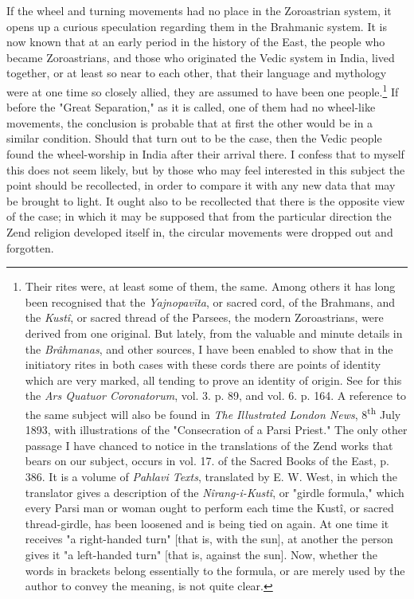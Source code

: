 \documentclass[a4paper, 11pt, oneside, polutonikogreek, english]{article}
\begin{document}
If the wheel and turning movements had no place in the Zoroastrian system, it opens up a curious speculation regarding them in the Brahmanic system. It is now known that at an early period in the history of the East, the people who became Zoroastrians, and those who originated the Vedic system in India, lived together, or at least so near to each other, that their language and mythology were at one time so closely allied, they are assumed to have been one people.\footnote{Their rites were, at least some of them, the same. Among others it has long been recognised that the \emph{Yajnopavīta}, or sacred cord, of the Brahmans, and the \emph{Kustî}, or sacred thread of the Parsees, the modern Zoroastrians, were derived from one original. But lately, from the valuable and minute details in the \emph{Brâhmanas}, and other sources, I have been enabled to show that in the initiatory rites in both cases with these cords there are points of identity which are very marked, all tending to prove an identity of origin. See for this the \emph{Ars Quatuor Coronatorum}, vol. 3. p. 89, and vol. 6. p. 164. A reference to the same subject will also be found in \emph{The Illustrated London News}, 8\textsuperscript{th} July 1893, with illustrations of the "Consecration of a Parsi Priest." The only other passage I have chanced to notice in the translations of the Zend works that bears on our subject, occurs in vol. 17. of the Sacred Books of the East, p. 386. It is a volume of \emph{Pahlavi Texts}, translated by E. W. West, in which the translator gives a description of the \emph{Nîrang-i-Kustî}, or "girdle formula," which every Parsi man or woman ought to perform each time the Kustî, or sacred thread-girdle, has been loosened and is being tied on again. At one time it receives "a right-handed turn" [that is, with the sun], at another the person gives it "a left-handed turn" [that is, against the sun]. Now, whether the words in brackets belong essentially to the formula, or are merely used by the author to convey the meaning, is not quite clear.} If before the "Great Separation," as it is called, one of them had no wheel-like movements, the conclusion is probable that at first the other would be in a similar condition. Should that turn out to be the case, then the Vedic people found the wheel-worship in India after their arrival there. I confess that to myself this does not seem likely, but by those who may feel interested in this subject the point should be recollected, in order to compare it with any new data that may be brought to light. It ought also to be recollected that there is the opposite view of the case; in which it may be supposed that from the particular direction the Zend religion developed itself in, the circular movements were dropped out and forgotten.
\end{document}

